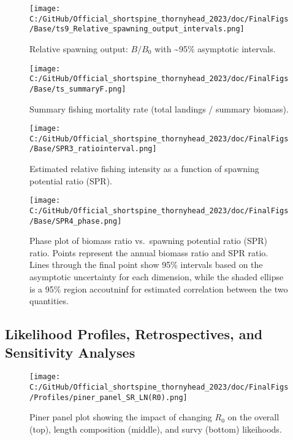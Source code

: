 \documentclass[11pt,
  letterpaper,
]{article}
\begin{document}
\begin{figure}
\centering
\texttt{[image: C:/GitHub/Official\_shortspine\_thornyhead\_2023/doc/FinalFigs/Base/ts9\_Relative\_spawning\_output\_intervals.png]}
\caption{Relative spawning output: \(B/B_0\) with \sim  95\% asymptotic intervals.\label{fig:relspawnout}}
\end{figure}

\begin{figure}
\centering
\texttt{[image: C:/GitHub/Official\_shortspine\_thornyhead\_2023/doc/FinalFigs/Base/ts\_summaryF.png]}
\caption{Summary fishing mortality rate (total landings / summary biomass).\label{fig:summary_f}}
\end{figure}

\begin{figure}
\centering
\texttt{[image: C:/GitHub/Official\_shortspine\_thornyhead\_2023/doc/FinalFigs/Base/SPR3\_ratiointerval.png]}
\caption{Estimated relative fishing intensity as a function of spawning potential ratio (SPR).\label{fig:spr_trajectory}}
\end{figure}

\begin{figure}
\centering
\texttt{[image: C:/GitHub/Official\_shortspine\_thornyhead\_2023/doc/FinalFigs/Base/SPR4\_phase.png]}
\caption{Phase plot of biomass ratio vs.~spawning potential ratio (SPR) ratio. Points represent the annual biomass ratio and SPR ratio. Lines through the final point show 95\% intervals based on the asymptotic uncertainty for each dimension, while the shaded ellipse is a 95\% region accoutninf for estimated correlation between the two quantities.\label{fig:phase_diagram}}
\end{figure}

\clearpage

\hypertarget{likelihood-profiles-retrospectives-and-sensitivity-analyses}{%
\subsection{Likelihood Profiles, Retrospectives, and Sensitivity Analyses}\label{likelihood-profiles-retrospectives-and-sensitivity-analyses}}

\begin{figure}
\centering
\texttt{[image: C:/GitHub/Official\_shortspine\_thornyhead\_2023/doc/FinalFigs/Profiles/piner\_panel\_SR\_LN(R0).png]}
\caption{Piner panel plot showing the impact of changing \(R_0\) on the overall (top), length composition (middle), and survy (bottom) likeihoods.\label{fig:R0_prof}}
\end{figure}
\end{document}
